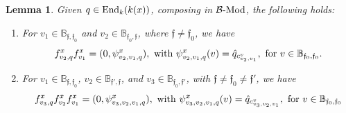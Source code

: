 \documentclass{article}
\newtheorem{lemma}[theorem]{Lemma}
\theoremstyle{definition}
\newcommand{\End}{{ \rm End }}
\newcommand{\Mod}{{ \rm Mod }}
\renewcommand{\frak}{\mathfrak}
\newcommand{\g}{\hbox{-}}
\newcommand{\hueca}[1]{\mathbb{#1}}
\begin{document}
\begin{lemma}\label{L: compos con basicos y fx(v2,v1,q)} Given $q\in \End_k(k(x))$, composing in ${\cal B}\g\Mod$, the following holds:
\begin{enumerate}
\item For $v_1\in \hueca{B}_{\frak{f},\frak{f}_0}$ and $v_2\in \hueca{B}_{\frak{f}_0,\frak{f}}$, where $\frak{f}\not=\frak{f}_0$, we have 
$$f^x_{v_2,q}f^x_{v_1}=(0,\psi^x_{v_2,v_1,q}), \hbox{ with } \psi^x_{v_2,v_1,q}(v)=\hat{q}_{c^v_{v_2,v_1}}, \hbox{ for } v\in \hueca{B}_{\frak{f}_0,\frak{f}_0}.$$
\item For $v_1\in \hueca{B}_{\frak{f},\frak{f}_0}$, $v_2\in \hueca{B}_{\frak{f}',\frak{f}}$,  and $v_3\in \hueca{B}_{\frak{f}_0,\frak{f}'}$, with $\frak{f}\not=\frak{f}_0\not=\frak{f}'$, we have 
$$f^x_{v_3,q}f^x_{v_2}f^x_{v_1}=(0,\psi^x_{v_3,v_2,v_1,q}), \hbox{ with } \psi^x_{v_3,v_2,v_1,q}(v)=\hat{q}_{c^v_{v_3,v_2,v_1}},\hbox{ for } v\in \hueca{B}_{\frak{f}_0,\frak{f}_0}$$
\end{enumerate}
\end{lemma}
\end{document}
